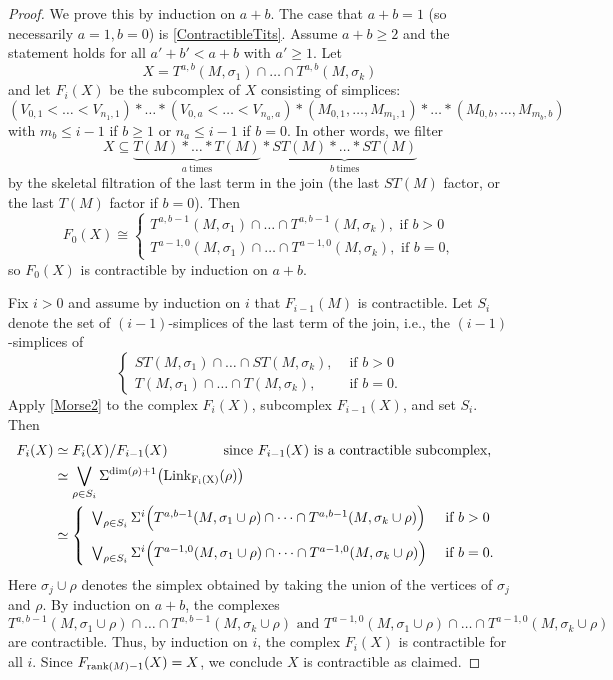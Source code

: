 \documentclass[a4paper]{amsart}
\providecommand{\Link}{\ensuremath\mr{Link}}
\numberwithin{theoremcounter}{section}
\theoremstyle{definition}
\theoremstyle{remark}
\newcommand{\mr}[1]{{\rm #1}}
\newcommand{\rank}{\mr{rank}}
\begin{document}
\begin{proof}
We prove this by induction on $a+b$. The case that $a+b=1$ (so necessarily $a=1, b=0$) is \autoref{ContractibleTits}. Assume $a+b \geq 2$ and the statement holds for all $a'+b'<a+b$ with $a'\geq 1$. Let 
$$X=T^{a,b}(M,\sigma_1) \cap \dots \cap T^{a,b}(M,\sigma_k)$$
 and let $F_i(X)$ be the subcomplex of $X$ consisting of simplices: 
$$ (V_{0,1} < \dots< V_{n_1,1}  ) * \dots * (V_{0,a} < \dots< V_{n_a,a}  ) * (M_{0,1},\dots,M_{m_1,1}  ) * \dots * (M_{0,b},\dots,M_{m_b,b}  ) $$
 with $m_b \leq i-1$ if $b \geq 1$ or $n_a \leq i-1$ if $b=0$. In other words, we filter 
$$X \subseteq \underbrace{T(M) * \dots * T(M)}_{a\ \text{times}} * \underbrace{ST(M) * \dots * ST(M)}_{b\ \text{times}}$$ 
by the skeletal filtration of the last term in the join (the last $ST(M)$ factor, or the last $T(M)$ factor if $b=0$). Then 
$$F_0(X) \cong  \left\{ \begin{array}{l}  T^{a,b-1}(M,\sigma_1) \cap \dots \cap T^{a,b-1}(M,\sigma_k), \text{ if $b> 0$} \\ T^{a-1,0}(M,\sigma_1) \cap \dots \cap T^{a-1,0}(M,\sigma_k), \text{ if $b= 0$}, \end{array}\right. $$ 
so $F_0(X)$ is contractible by induction on $a+b$. 

Fix $i>0$ and assume by induction on $i$ that $F_{i-1}(M)$ is contractible. Let $S_i$ denote the set of $(i-1)$-simplices of the last term of the join, i.e., the $(i-1)$-simplices of
%
$$   \left\{ \begin{array}{ll}   ST(M,\sigma_1) \cap \dots \cap ST(M,\sigma_k) , &\text{ if $b> 0$} \\ 
T(M,\sigma_1) \cap \dots \cap T(M,\sigma_k) , & \text{ if $b= 0$} . 
 \end{array}\right. $$ 
Apply \autoref{Morse2} to the complex $F_i(X)$, subcomplex $F_{i-1}(X)$, and set $S_i$. Then \begin{align*}F_i(X) &\simeq F_i(X)/F_{i-1}(X)   \qquad \qquad \text{since $F_{i-1}(X) $ is a contractible subcomplex,} 
\\& \simeq  \bigvee_{\rho \in S_i} \Sigma^{\dim(\rho)+1} \big( \Link_{F_i(X)}(\rho) \big)
\\& \simeq  \left\{ \begin{array}{ll}   \bigvee_{\rho \in S_i} \Sigma^{i}  \Big( T^{a,b-1}(M,\sigma_1 \cup \rho) \cap \dots \cap T^{a,b-1}(M,\sigma_k \cup \rho)\Big) &\text{ if $b> 0$} \\[1em] 
 \bigvee_{\rho \in S_i} \Sigma^{i} \Big( T^{a-1,0}(M,\sigma_1 \cup \rho) \cap \dots \cap T^{a-1,0}(M,\sigma_k \cup \rho) \Big)
& \text{ if $b= 0$} . 
 \end{array}\right. \end{align*} 
Here $\sigma_j \cup \rho$ denotes the simplex obtained by taking the union of the vertices of $\sigma_j$ and $\rho$. By induction on $a+b$, the complexes 
$$ T^{a,b-1}(M,\sigma_1 \cup \rho) \cap \dots \cap T^{a,b-1}(M,\sigma_k \cup \rho) \text{ and } T^{a-1,0}(M,\sigma_1 \cup \rho) \cap \dots \cap T^{a-1,0}(M,\sigma_k \cup \rho) $$ 
are contractible. Thus, by induction on $i$, the complex $F_i(X)$ is contractible  for all $i$. Since $F_{\rank(M)-1}(X)=X$, we conclude $X$ is contractible as claimed.  
\end{proof}
\end{document}
